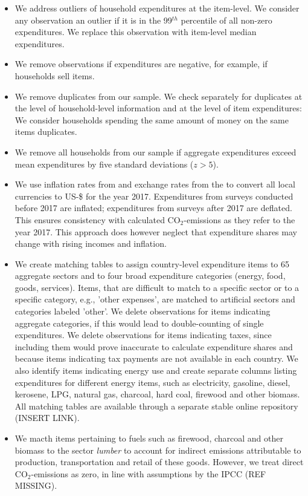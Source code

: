 \documentclass[12pt, a4paper]{article}
\begin{document}
\begin{itemize}
    \item We address outliers of household expenditures at the item-level. We consider any observation an outlier if it is in the 99$^{th}$ percentile of all non-zero expenditures. We replace this observation with item-level median expenditures.
    \item We remove observations if expenditures are negative, for example, if households sell items.
    \item We remove duplicates from our sample. We check separately for duplicates at the level of household-level information and at the level of item expenditures: We consider households spending the same amount of money on the same items duplicates.
    \item We remove all households from our sample if aggregate expenditures exceed mean expenditures by five standard deviations ($z>5$).
    \item We use inflation rates from \textcite{IMF.2020} and exchange rates from the \textcite{WorldBankGroup.2023} to convert all local currencies to US-\$ for the year 2017. Expenditures from surveys conducted before 2017 are inflated; expenditures from surveys after 2017 are deflated. This ensures consistency with calculated CO$_{2}$-emissions as they refer to the year 2017. This approach does however neglect that expenditure shares may change with rising incomes and inflation.
    \item We create matching tables to assign country-level expenditure items to 65 aggregate sectors and to four broad expenditure categories (energy, food, goods, services). Items, that are difficult to match to a specific sector or to a specific category, e.g., 'other expenses', are matched to artificial sectors and categories labeled 'other'. We delete observations for items indicating aggregate categories, if this would lead to double-counting of single expenditures. We delete observations for items indicating taxes, since including them would prove inaccurate to calculate expenditure shares and because items indicating tax payments are not available in each country. We also identify items indicating energy use and create separate columns listing expenditures for different energy items, such as electricity, gasoline, diesel, kerosene, LPG, natural gas, charcoal, hard coal, firewood and other biomass. All matching tables are available through a separate stable online repository (INSERT LINK).
    \item We macth items pertaining to fuels such as firewood, charcoal and other biomass to the sector \textit{lumber} to account for indirect emissions attributable to production, transportation and retail of these goods. However, we treat direct CO$_{2}$-emissions as zero, in line with assumptions by the IPCC (REF MISSING).
\end{itemize}
\end{document}
